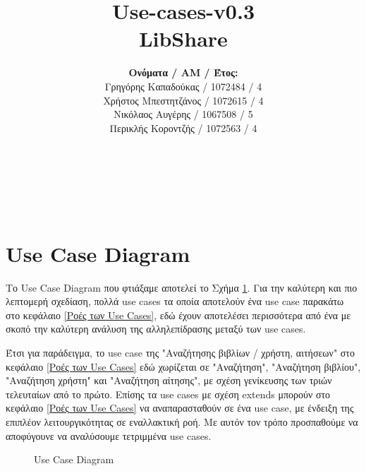 \documentclass[12pt,a4paper]{article}
\title{Use-cases-v0.3 \\ LibShare}
\author{\textbf{Ονόματα / ΑΜ / Έτος:} \\ Γρηγόρης Καπαδούκας / 1072484 / 4\textdegree \\ Χρήστος Μπεστητζάνος / 1072615 / 4\textdegree \\ Νικόλαος Αυγέρης / 1067508 / 5\textdegree \\ Περικλής Κοροντζής / 1072563 / 4\textdegree}
\begin{document}
\makeatletter
\begin{center}
	\LARGE{\@title} \\
	\pagebreak
	\begin{LARGE}\@author\end{LARGE} \\
\end{center}
\pagebreak

\section{Use Case Diagram}

Το Use Case Diagram που φτιάξαμε αποτελεί το Σχήμα \ref{Use Case Diagram}. Για την καλύτερη και πιο λεπτομερή σχεδίαση, πολλά use cases τα οποία αποτελούν ένα use case παρακάτω στο κεφάλαιο \ref{Ροές των Use Cases}, εδώ έχουν αποτελέσει περισσότερα από ένα με σκοπό την καλύτερη ανάλυση της αλληλεπίδρασης μεταξύ των use cases.

Έτσι για παράδειγμα, το use case της "Αναζήτησης βιβλίων / χρήστη, αιτήσεων" στο κεφάλαιο \ref{Ροές των Use Cases} εδώ χωρίζεται σε "Αναζήτηση", "Αναζήτηση βιβλίου", "Αναζήτηση χρήστη" και "Αναζήτηση αίτησης", με σχέση γενίκευσης των τριών τελευταίων από το πρώτο. Επίσης τα use cases με σχέση extends μπορούν στο κεφάλαιο \ref{Ροές των Use Cases} να αναπαρασταθούν σε ένα use case, με ένδειξη της επιπλέον λειτουργικότητας σε εναλλακτική ροή. Με αυτόν τον τρόπο προσπαθούμε να αποφύγουνε να αναλύσουμε τετριμμένα use cases.

\begin{figure}[H]
	\caption{Use Case Diagram}
	\label{Use Case Diagram}
\end{figure}
\end{document}
